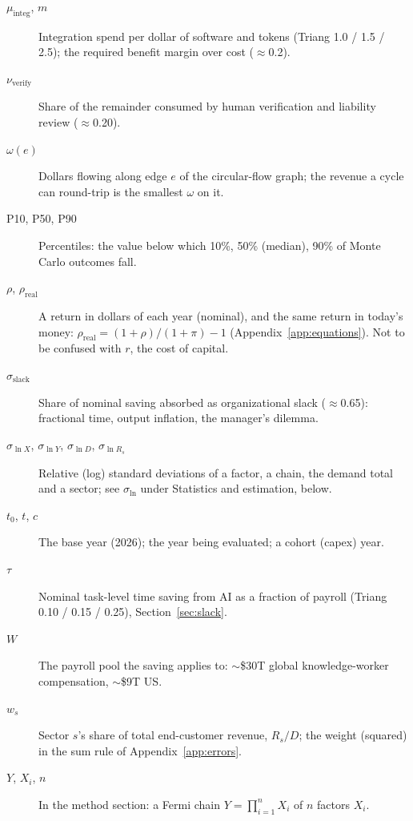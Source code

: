 \documentclass[11pt,letterpaper]{article}
\begin{document}
\begin{description}
\item[$\mu_{\text{integ}}$, $m$] Integration spend per dollar of software and tokens (Triang 1.0 / 1.5 / 2.5); the required benefit margin over cost ($\approx$0.2).
\item[$\nu_{\text{verify}}$] Share of the remainder consumed by human verification and liability review ($\approx$0.20).
\item[$\omega(e)$] Dollars flowing along edge $e$ of the circular-flow graph; the revenue a cycle can round-trip is the smallest $\omega$ on it.
\item[P10, P50, P90] Percentiles: the value below which 10\%, 50\% (median), 90\% of Monte Carlo outcomes fall.
\item[$\rho$, $\rho_{\text{real}}$] A return in dollars of each year (nominal), and the same return in today's money: $\rho_{\text{real}}=(1+\rho)/(1+\pi)-1$ (Appendix~\ref{app:equations}). Not to be confused with $r$, the cost of capital.
\item[$\sigma_{\text{slack}}$] Share of nominal saving absorbed as organizational slack ($\approx$0.65): fractional time, output inflation, the manager's dilemma.
\item[$\sigma_{\ln X}$, $\sigma_{\ln Y}$, $\sigma_{\ln D}$, $\sigma_{\ln R_s}$] Relative (log) standard deviations of a factor, a chain, the demand total and a sector; see \emph{$\sigma_{\ln}$} under Statistics and estimation, below.
\item[$t_0$, $t$, $c$] The base year (2026); the year being evaluated; a cohort (capex) year.
\item[$\tau$] Nominal task-level time saving from AI as a fraction of payroll (Triang 0.10 / 0.15 / 0.25), Section~\ref{sec:slack}.
\item[$W$] The payroll pool the saving applies to: $\sim$\$30T global knowledge-worker compensation, $\sim$\$9T US.
\item[$w_s$] Sector $s$'s share of total end-customer revenue, $R_s/D$; the weight (squared) in the sum rule of Appendix~\ref{app:errors}.
\item[$Y$, $X_i$, $n$] In the method section: a Fermi chain $Y=\prod_{i=1}^{n}X_i$ of $n$ factors $X_i$.
\end{description}
\end{document}
